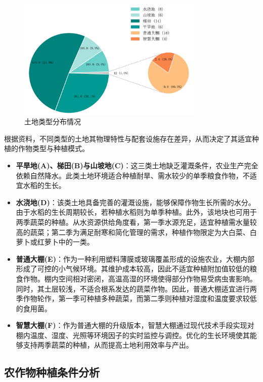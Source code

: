 \begin{figure}[htbp]
    \centering
    \includegraphics[width=0.8\textwidth]{figs/2数据分析与预处理/土地类型分布.png}
    \caption{土地类型分布情况}
    \label{fig:land_distribution}
\end{figure}

根据资料，不同类型的土地其物理特性与配套设施存在差异，从而决定了其适宜种植的作物类型与种植模式。
\begin{itemize}
    \item \textbf{平旱地(A)、梯田(B)与山坡地(C)}：这三类土地缺乏灌溉条件，农业生产完全依赖自然降水。此类土地环境适合种植耐旱、需水较少的单季粮食作物，不适宜水稻的生长。
    \item \textbf{水浇地(D)}：该类土地具备完善的灌溉设施，能够保障作物生长所需的水分。由于水稻的生长周期较长，若种植水稻则为单季种植。此外，该地块也可用于两季蔬菜的种植。从水资源供给角度看，第一季水源充足，适宜种植需水量较高的蔬菜；第二季为满足耐寒和简化管理的需求，种植作物限定为大白菜、白萝卜或红萝卜中的一类。
    \item \textbf{普通大棚(E)}：作为一种利用塑料薄膜或玻璃覆盖形成的设施农业，大棚内部形成了可控的小气候环境。其维护成本较高，因此不适宜种植附加值较低的粮食作物。棚内空间相对密闭，高温高湿的环境使得部分作物易受病虫害影响。同时，其土层较浅，不适合根系发达的蔬菜作物。因此，普通大棚适宜进行两季作物轮作，第一季可种植多种蔬菜，而第二季则种植对湿度和温度要求较低的食用菌。
    \item \textbf{智慧大棚(F)}：作为普通大棚的升级版本，智慧大棚通过现代技术手段实现对棚内温度、湿度、光照等环境因子的实时监控与调控。优化的生长环境使其能够支持两季蔬菜的种植，从而提高土地利用效率与产出。
\end{itemize}

\subsection{农作物种植条件分析}

